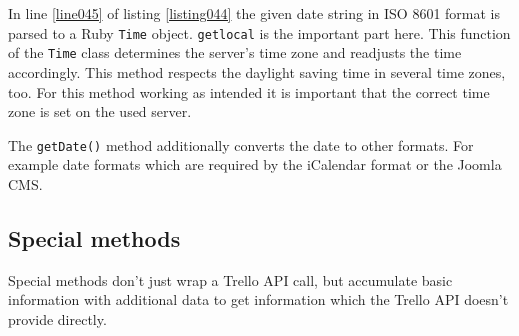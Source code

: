 In line \ref{line045} of listing \ref{listing044} the given date string in ISO 8601 format is parsed to a Ruby \lstinline{Time} object. \lstinline{getlocal} is the important part here. This function of the \lstinline{Time} class determines the server's time zone and readjusts the time accordingly. This method respects the daylight saving time in several time zones, too. For this method working as intended it is important that the correct time zone is set on the used server. 

The \lstinline{getDate()} method additionally converts the date to other formats. For example date formats which are required by the iCalendar format or the Joomla CMS.

\subsection{Special methods}
Special methods don't just wrap a Trello API call, but accumulate basic information with additional data to get information which the Trello API doesn't provide directly.

